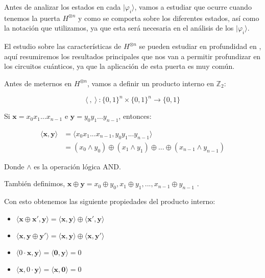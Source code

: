  Antes de analizar los estados en cada $|\varphi_{i}\rangle$, vamos a estudiar que ocurre cuando tenemos la puerta $H^{\otimes n}$ y como se comporta sobre los diferentes estados, así como la notación que utilizamos, ya que esta será necesaria en el análisis de los $|\varphi_{i}\rangle$. \newline

 El estudio sobre las características de $H^{\otimes n}$ se pueden estudiar en profundidad en \citealp[\textit{Quantum computing for computer scientists}]{B:QuantumScientist:2008}, aquí resumiremos los resultados principales que nos van a permitir profundizar en los circuitos cuánticos, ya que la aplicación de esta puerta es muy común.\newline

 Antes de meternos en $H^{\otimes n}$, vamos a definir un producto interno en $\mathbb{Z}_{2}$:\newline

 \begin{equation*}
     \langle\:,\:\rangle\::\{0,1\}^{n} \times \{0,1\}^{n} \rightarrow \{0,1\}\end{equation*}

 Si $\mathbf{x}=x_{0}x_{1}...x_{n-1}$ e $\mathbf{y}=y_{0}y_{1}...y_{n-1}$, entonces:

 \begin{equation*}
     \begin{split}
     \langle\mathbf{x},\mathbf{y}\rangle &= \langle x_{0}x_{1}...x_{n-1},y_{0}y_{1}...y_{n-1}\rangle \\ &= (x_{0}\land y_{0})\oplus(x_{1}\land y_{1})\oplus...\oplus(x_{n-1}\land y_{n-1})
     \end{split}
 \end{equation*}

 Donde $\land$ es la operación lógica AND.\newline

 También definimos, $\mathbf{x}\oplus\mathbf{y}=x_{0}\oplus y_{0},x_{1}\oplus y_{1},...,x_{n-1}\oplus y_{n-1}$ .\newline

 Con esto obtenemos las siguiente propiedades del producto interno:

 \begin{itemize}
     \item $\langle \mathbf{x} \oplus \mathbf{x}',\mathbf{y}\rangle=\langle \mathbf{x},\mathbf{y}\rangle \oplus \langle \mathbf{x}',\mathbf{y}\rangle$

     \item $\langle \mathbf{x},\mathbf{y} \oplus \mathbf{y}'\rangle=\langle \mathbf{x},\mathbf{y}\rangle \oplus \langle \mathbf{x},\mathbf{y}'\rangle$

     \item $\langle 0\cdot \mathbf{x},\mathbf{y}\rangle=\langle\mathbf{0},\mathbf{y}\rangle=0$

     \item $\langle \mathbf{x}, 0 \cdot \mathbf{y}\rangle=\langle \mathbf{x},\mathbf{0}\rangle=0$
 \end{itemize}

